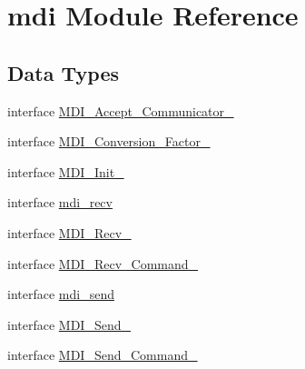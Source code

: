 \hypertarget{classmdi}{\section{mdi Module Reference}
\label{classmdi}
}
\subsection*{Data Types}
\begin{DoxyCompactItemize}
\item 
interface \hyperlink{interfacemdi_1_1MDI__Accept__Communicator__}{M\-D\-I\-\_\-\-Accept\-\_\-\-Communicator\-\_\-}
\item 
interface \hyperlink{interfacemdi_1_1MDI__Conversion__Factor__}{M\-D\-I\-\_\-\-Conversion\-\_\-\-Factor\-\_\-}
\item 
interface \hyperlink{interfacemdi_1_1MDI__Init__}{M\-D\-I\-\_\-\-Init\-\_\-}
\item 
interface \hyperlink{interfacemdi_1_1mdi__recv}{mdi\-\_\-recv}
\item 
interface \hyperlink{interfacemdi_1_1MDI__Recv__}{M\-D\-I\-\_\-\-Recv\-\_\-}
\item 
interface \hyperlink{interfacemdi_1_1MDI__Recv__Command__}{M\-D\-I\-\_\-\-Recv\-\_\-\-Command\-\_\-}
\item 
interface \hyperlink{interfacemdi_1_1mdi__send}{mdi\-\_\-send}
\item 
interface \hyperlink{interfacemdi_1_1MDI__Send__}{M\-D\-I\-\_\-\-Send\-\_\-}
\item 
interface \hyperlink{interfacemdi_1_1MDI__Send__Command__}{M\-D\-I\-\_\-\-Send\-\_\-\-Command\-\_\-}
\end{DoxyCompactItemize}

